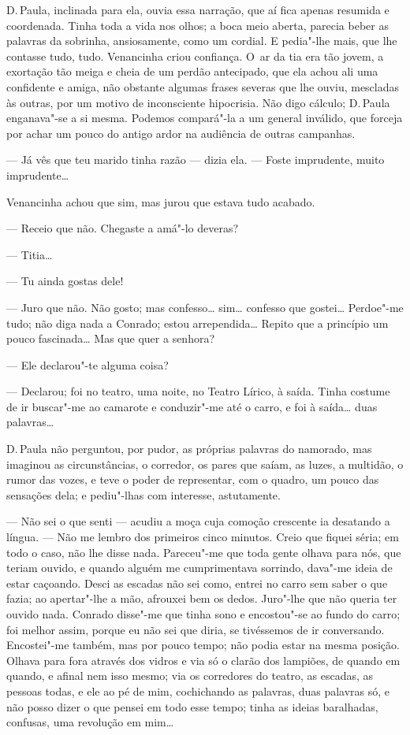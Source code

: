 \begin{linenumbers}
D.\,Paula, inclinada para ela, ouvia essa narração, que aí fica apenas
resumida e coordenada. Tinha toda a vida nos olhos; a boca meio aberta,
parecia beber as palavras da sobrinha, ansiosamente, como um cordial. E
pedia"-lhe mais, que lhe contasse tudo, tudo. Venancinha criou confiança.
O~ar da tia era tão jovem, a exortação tão meiga e cheia de um perdão
antecipado, que ela achou ali uma confidente e amiga, não obstante
algumas frases severas que lhe ouviu, mescladas às outras, por um motivo
de inconsciente hipocrisia. Não digo cálculo; D.\,Paula enganava"-se a si
mesma. Podemos compará"-la a um general inválido, que forceja por achar
um pouco do antigo ardor na audiência de outras campanhas.

--- Já vês que teu marido tinha razão --- dizia ela. --- Foste imprudente,
muito imprudente\ldots{}

Venancinha achou que sim, mas jurou que estava tudo acabado.

--- Receio que não. Chegaste a amá"-lo deveras?

--- Titia\ldots{}

--- Tu ainda gostas dele!

--- Juro que não. Não gosto; mas confesso\ldots{} sim\ldots{} confesso que
gostei\ldots{} Perdoe"-me tudo; não diga nada a Conrado; estou arrependida\ldots{} Repito que
a princípio um pouco fascinada\ldots{} Mas que quer a senhora?

--- Ele declarou"-te alguma coisa?

--- Declarou; foi no teatro, uma noite, no Teatro Lírico, à saída. Tinha
costume de ir buscar"-me ao camarote e conduzir"-me até o carro, e foi à
saída\ldots{} duas palavras\ldots{}

D.\,Paula não perguntou, por pudor, as próprias palavras do namorado, mas
imaginou as circunstâncias, o corredor, os pares que saíam, as luzes, a
multidão, o rumor das vozes, e teve o poder de representar, com o
quadro, um pouco das sensações dela; e pediu"-lhas com interesse,
astutamente.

--- Não sei o que senti --- acudiu a moça cuja comoção crescente ia
desatando a língua. --- Não me lembro dos primeiros cinco minutos. Creio
que fiquei séria; em todo o caso, não lhe disse nada. Pareceu"-me que
toda gente olhava para nós, que teriam ouvido, e quando alguém me
cumprimentava sorrindo, dava"-me ideia de estar caçoando. Desci as
escadas não sei como, entrei no carro sem saber o que fazia; ao
apertar"-lhe a mão, afrouxei bem os dedos. Juro"-lhe que não queria ter
ouvido nada. Conrado disse"-me que tinha sono e encostou"-se ao fundo do
carro; foi melhor assim, porque eu não sei que diria, se tivéssemos de
ir conversando. Encostei"-me também, mas por pouco tempo; não podia estar
na mesma posição. Olhava para fora através dos vidros e via só o clarão
dos lampiões, de quando em quando, e afinal nem isso mesmo; via os
corredores do teatro, as escadas, as pessoas todas, e ele ao pé de mim,
cochichando as palavras, duas palavras só, e não posso dizer o que
pensei em todo esse tempo; tinha as ideias baralhadas, confusas, uma
revolução em mim\ldots{}


\end{linenumbers}
